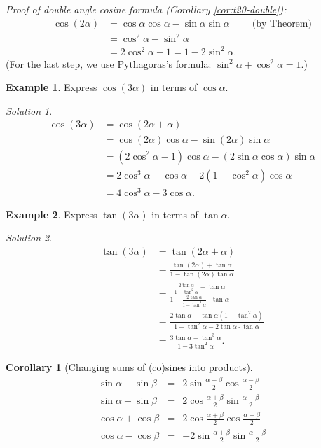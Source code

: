 \documentclass[
  english,
  12pt,
  oneside]{book}
\newtheorem{corollary}{Corollary}[chapter]
\theoremstyle{definition}
\theoremstyle{definition}
\newtheorem{example}{Example}[chapter]
\theoremstyle{definition}
\theoremstyle{definition}
\theoremstyle{remark}
\newtheorem*{solution}{Solution}
\begin{document}
\emph{Proof of double angle cosine formula (Corollary \ref{cor:t20-double}):}
\begin{align*}
\cos(2\alpha) &= \cos\alpha\cos\alpha - \sin\alpha\sin\alpha   &&\text{(by Theorem)}\\
&= \cos^2\alpha-\sin^2\alpha\\
&= 2\cos^2\alpha - 1 = 1-2\sin^2\alpha.
\end{align*}
(For the last step, we use Pythagoras's formula: \(\sin^2\alpha+\cos^2\alpha=1\).)

\begin{example}
Express \(\cos(3\alpha)\) in terms of \(\cos\alpha\).
\end{example}

\begin{solution}
\begin{align*}
\cos(3\alpha) &=
\cos(2\alpha+\alpha) \\
&= \cos(2\alpha)\cos\alpha - \sin(2\alpha)\sin\alpha\\
&= (2\cos^2\alpha-1)\cos\alpha - (2\sin\alpha\cos\alpha)\sin\alpha\\
&= 2\cos^3\alpha - \cos\alpha - 2(1-\cos^2\alpha)\cos\alpha\\
&= 4\cos^3\alpha - 3\cos\alpha.
\end{align*}
\end{solution}

\begin{example}
Express \(\tan(3\alpha)\) in terms of \(\tan\alpha\).
\end{example}

\begin{solution}
\begin{align*}
\tan(3\alpha) &=
  \tan(2\alpha+\alpha)\\
&=\frac{\tan(2\alpha)+\tan\alpha}{1-\tan(2\alpha)\tan\alpha}\\
&=\frac{\frac{2\tan\alpha}{1-\tan^2\alpha}+\tan\alpha}{1-\frac{2\tan\alpha}{1-\tan^2\alpha}\cdot\tan\alpha}\\
&=\frac{2\tan\alpha+\tan\alpha(1-\tan^2\alpha)}{1-\tan^2\alpha - 2\tan\alpha\cdot\tan\alpha}\\
&=\frac{3\tan\alpha-\tan^3\alpha}{1-3\tan^2\alpha}.
\end{align*}
\end{solution}

\begin{corollary}[Changing sums of (co)sines into products]
\protect\hypertarget{cor:t20-prods}{}\label{cor:t20-prods}\[\boxed{
\begin{array}{rcl}
\sin\alpha + \sin\beta &=& 2\sin\tfrac{\alpha+\beta}2\cos\tfrac{\alpha-\beta}2\\
\sin\alpha - \sin\beta &=& 2\cos\tfrac{\alpha+\beta}2\sin\tfrac{\alpha-\beta}2\\
\cos\alpha + \cos\beta &=& 2\cos\tfrac{\alpha+\beta}2\cos\tfrac{\alpha-\beta}2\\
\cos\alpha - \cos\beta &=& - 2\sin\tfrac{\alpha+\beta}2\sin\tfrac{\alpha-\beta}2\\
\end{array}
}\]
\end{corollary}
\end{document}
